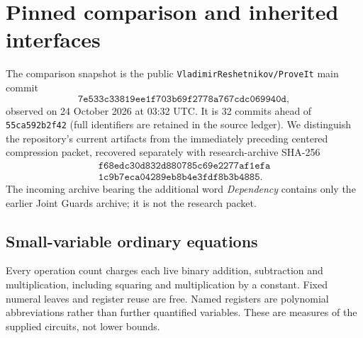 \section{Pinned comparison and inherited interfaces}
\label{sec:wave13-pinned-comparison}

The comparison snapshot is the public \texttt{VladimirReshetnikov/ProveIt}
main commit
\[
\texttt{7e533c33819ee1f703b69f2778a767cdc069940d},
\]
observed on 24 October 2026 at 03:32 UTC.  It is 32 commits ahead of
\texttt{55ca592b2f42} (full identifiers are retained in the source ledger).  We distinguish the
repository's current artifacts from the immediately preceding centered
compression packet, recovered separately with research-archive SHA-256
\[
\begin{gathered}
\texttt{f68edc30d832d880785c69e2277af1efa}\\
\texttt{1c9b7eca04289eb8b4e3fdf8b3b4885}.
\end{gathered}
\]
The incoming archive bearing the additional word \emph{Dependency}
contains only the earlier Joint Guards archive; it is not the research
packet.

\subsection{Small-variable ordinary equations}
Every operation count charges each live binary addition, subtraction
and multiplication, including squaring and multiplication by a constant.
Fixed numeral leaves and register reuse are free.  Named registers are
polynomial abbreviations rather than further quantified variables.
These are measures of the supplied circuits, not lower bounds.

